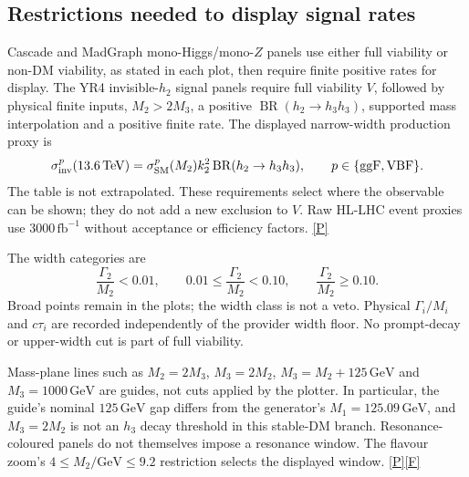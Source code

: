 \documentclass[11pt,a4paper]{article}
\newcommand{\src}[1]{\hyperlink{src:#1}{\textsf{[#1]}}}
\newcommand{\GeV}{\,\mathrm{GeV}}
\newcommand{\BR}{\operatorname{BR}}
\begin{document}
\subsection{Restrictions needed to display signal rates}
Cascade and MadGraph mono-Higgs/mono-$Z$ panels use either full viability
or non-DM viability, as stated in each plot, then require finite positive
rates for display. The YR4 invisible-$h_2$ signal panels require full
viability $V$, followed by physical finite inputs, $M_2>2M_3$, a positive
$\BR(h_2\to h_3h_3)$, supported mass interpolation and a positive
finite rate. The displayed narrow-width production proxy is
\begin{equation}
 \sigma_{\rm inv}^{p}(13.6\,\mathrm{TeV})
 =\sigma_{\rm SM}^{p}(M_2)k_2^2\BR(h_2\to h_3h_3),
 \qquad p\in\{\mathrm{ggF},\mathrm{VBF}\}.
\end{equation}
The table is not extrapolated. These requirements select where the
observable can be shown; they do not add a new exclusion to $V$.
Raw HL-LHC event proxies use $3000\,\mathrm{fb}^{-1}$ without acceptance
or efficiency factors. \src{P}

The width categories are
\begin{equation}
 \frac{\Gamma_2}{M_2}<0.01,\qquad
 0.01\le\frac{\Gamma_2}{M_2}<0.10,\qquad
 \frac{\Gamma_2}{M_2}\ge0.10.
\end{equation}
Broad points remain in the plots; the width class is not a veto. Physical
$\Gamma_i/M_i$ and $c\tau_i$ are recorded independently of the provider
width floor. No prompt-decay or upper-width cut is part of full viability.

Mass-plane lines such as $M_2=2M_3$, $M_3=2M_2$,
$M_3=M_2+125\GeV$ and $M_3=1000\GeV$ are guides, not cuts applied
by the plotter. In particular, the guide's nominal $125\GeV$ gap differs
from the generator's $M_1=125.09\GeV$, and $M_3=2M_2$ is not an
$h_3$ decay threshold in this stable-DM branch. Resonance-coloured panels
do not themselves impose a resonance window. The flavour zoom's
$4\le M_2/\mathrm{GeV}\le9.2$ restriction selects the displayed window.
\src{P}\src{F}
\end{document}
